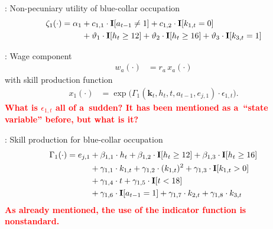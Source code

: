 \begin{frame}{\insertsection: Non-pecuniary utility of blue-collar occupation}
%
  \begin{align*}
  \zeta_{1}(\cdot)  = \alpha_1 & + c_{1,1} \cdot {\textbf{I}}[a_{t-1} \neq 1] + c_{1,2} \cdot {\textbf{I}}[k_{1,t} = 0] \\
                              & + \vartheta_1 \cdot {\textbf{I}}[h_t \geq 12] + \vartheta_2 \cdot {\textbf{I}}[h_t \geq 16] + \vartheta_3 \cdot {\textbf{I}}[k_{3,t} = 1]
  \end{align*}
\end{frame}
\begin{frame}{\insertsection: Wage component}
%
\begin{align*}
w_{a}(\cdot) & = r_{a} \, x_{a}(\cdot)
\end{align*}
with skill production function
\begin{align*}
x_{1}(\cdot) & = \exp \big( \Gamma_{1}(\bm{k}_t,  h_t, t, a_{t-1}, e_{j,1}) \cdot \epsilon_{1,t} \big).
\end{align*}
\textbf{\textcolor{red}{What is $\epsilon_{1,t}$ all of a~sudden? It has been mentioned as a~``state variable'' before, but what is it?}}
\end{frame}
\begin{frame}{\insertsection: Skill production for blue-collar occupation}
%
\begin{align*}
     \Gamma_1(\cdot) = e_{j,1} & + \beta_{1,1} \cdot h_t + \beta_{1, 2} \cdot {\textbf{I}}[h_t \geq 12] + \beta_{1,3} \cdot {\textbf{I}}[h_t\geq 16]\\
                                   & + \gamma_{1, 1} \cdot  k_{1,t} + \gamma_{1,2} \cdot  (k_{1,t})^2 + \gamma_{1,3} \cdot  {\textbf{I}}[k_{1,t} > 0] \\
                                 & + \gamma_{1,4} \cdot  t + \gamma_{1,5} \cdot {\textbf{I}}[t < 18]\\
                                   & + \gamma_{1,6} \cdot {\textbf{I}}[a_{t-1} = 1] + \gamma_{1,7} \cdot  k_{2,t} + \gamma_{1,8} \cdot  k_{3,t}
\end{align*}
\textbf{\textcolor{red}{As already mentioned, the use of the indicator function is nonstandard.}}
\end{frame}
